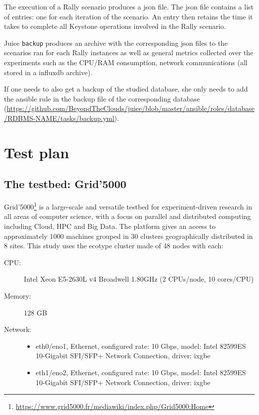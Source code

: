 The execution of a Rally scenario produces a json file. The json file contains a list of entries: one for each iteration of the scenario. An entry then retains the time it takes to complete all Keystone operations involved in the Rally scenario.

Juice \verb+backup+ produces an archive with the corresponding json files to the scenarios ran for each Rally instances as well as general metrics collected over the experiments such as the CPU/RAM consumption, network communications (all stored in a influxdb archive).

If one needs to also get a backup of the studied database, she only needs to add the ansible rule in the backup file of the corresponding database (\url{https://github.com/BeyondTheClouds/juice/blob/master/ansible/roles/database/RDBMS-NAME/tasks/backup.yml}).


\section{Test plan}
\label{sec:testplan}
\subsection{The testbed: Grid'5000}
Grid’5000\footnote{\url{https://www.grid5000.fr/mediawiki/index.php/Grid5000:Home}} is a large-scale and versatile testbed for experiment-driven research in all areas of computer science, with a focus on parallel and distributed computing including Cloud, HPC and Big Data. The platform gives an access to approximately 1000 machines grouped in 30 clusters geographically distributed in 8 sites. This study uses the ecotype cluster made of 48 nodes with each:

\begin{description}
    \item[CPU:] Intel Xeon E5-2630L v4 Broadwell 1.80GHz (2 CPUs/node, 10 cores/CPU)
    \item[Memory:] 128 GB
    \item[Network:]      \begin{itemize}
        \item eth0/eno1, Ethernet, configured rate: 10 Gbps, model: Intel 82599ES 10-Gigabit SFI/SFP+ Network Connection, driver: ixgbe
        \item eth1/eno2, Ethernet, configured rate: 10 Gbps, model: Intel 82599ES 10-Gigabit SFI/SFP+ Network Connection, driver: ixgbe
      \end{itemize}
\end{description}

